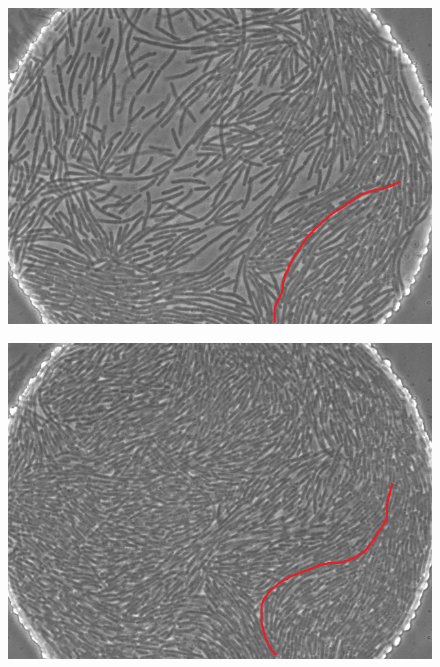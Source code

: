 \documentclass[a4paper,11pt]{jsarticle}
\begin{document}
\begin{figure}[htbp]
  \centering
  \begin{minipage}{0.45\linewidth}
    \centering
    \includegraphics[width=\columnwidth]{Series015_t090000_RAW_ch00.png}
    \label{fig:06_1_pt}
  \end{minipage}
  \begin{minipage}{0.45\linewidth}
    \centering
    \includegraphics[width=\columnwidth]{Series015_t120000_RAW_ch00.png}
    \label{fig:06_2_pt}
  \end{minipage}
  \begin{minipage}{0.45\linewidth}
    \centering

\end{minipage}
\end{figure}
\end{document}
